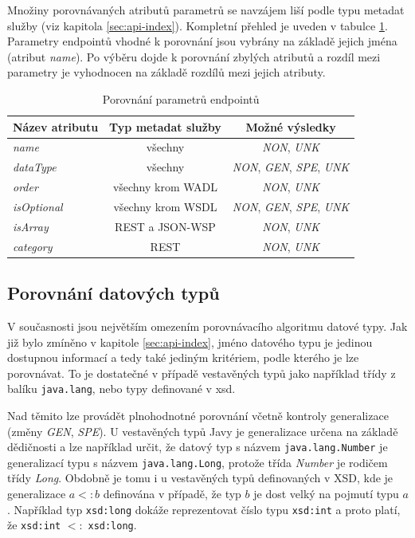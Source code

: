 \documentclass[czech,DP]{thesiskiv}
\begin{document}
Množiny porovnávaných atributů parametrů se navzájem liší podle typu metadat služby (viz kapitola \ref{sec:api-index}). Kompletní přehled je uveden v tabulce \ref{tab:param-cmp}. Parametry endpointů vhodné k porovnání jsou vybrány na základě jejich jména (atribut \textit{name}). Po výběru dojde k porovnání zbylých atributů a rozdíl mezi parametry je vyhodnocen na základě rozdílů mezi jejich atributy.

\begin{table}[h]
	\centering
	\begin{tabular}{|l|c|c|}
		\hline
		Název atributu & Typ metadat služby & Možné výsledky \\
		\hline
		\hline
		\textit{name} & všechny & \textit{NON}, \textit{UNK} \\
		\hline 
		\textit{dataType} & všechny & \textit{NON}, \textit{GEN}, \textit{SPE}, \textit{UNK} \\
		\hline
		\textit{order} & všechny krom WADL & \textit{NON}, \textit{UNK} \\
		\hline
		\textit{isOptional} & všechny krom WSDL & \textit{NON}, \textit{GEN}, \textit{SPE}, \textit{UNK} \\
		\hline
		\textit{isArray} & REST a JSON-WSP & \textit{NON}, \textit{UNK} \\
		\hline
		\textit{category} & REST & \textit{NON}, \textit{UNK} \\
		\hline
	\end{tabular}
	\caption{Porovnání parametrů endpointů }
	\label{tab:param-cmp}
\end{table}


\subsection{Porovnání datových typů}
\label{sec:type-cmp}
V současnosti jsou největším omezením porovnávacího algoritmu datové typy. Jak již bylo zmíněno v kapitole \ref{sec:api-index}, jméno datového typu je jedinou dostupnou informací a tedy také jediným kritériem, podle kterého je lze porovnávat. To je dostatečné v případě vestavěných typů jako například třídy z balíku \verb|java.lang|, nebo typy definované v xsd. 

Nad těmito lze provádět plnohodnotné porovnání včetně kontroly generalizace (změny \textit{GEN}, \textit{SPE}). U vestavěných typů Javy je generalizace určena na základě dědičnosti a lze například určit, že datový typ s názvem \verb|java.lang.Number| je generalizací typu s názvem \verb|java.lang.Long|, protože třída \textit{Number} je rodičem třídy \textit{Long}. Obdobně je tomu i u vestavěných typů definovaných v XSD, kde je generalizace $a <: b$ definována v případě, že typ $b$ je dost velký na pojmutí typu $a$. Například typ \verb|xsd:long| dokáže reprezentovat číslo typu \verb|xsd:int| a proto platí, že \verb|xsd:int| $<:$ \verb|xsd:long|. 
\end{document}
